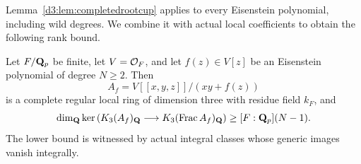 Lemma~\ref{d3:lem:completedrootcup} applies to every Eisenstein polynomial, including wild degrees. We combine it with actual local coefficients to obtain the following rank bound.


\begin{theorem}
\label{d3:thm:completedeisensteinrank}\label{d3:thm:completedtamerank}
Let $F/\mathbf Q_p$ be finite, let $V=\mathcal O_F$, and let $f(z)\in V[z]$ be an Eisenstein polynomial of degree $N\geq2$. Then
\[
A_f=V[[x,y,z]]/(xy+f(z))
\]
is a complete regular local ring of dimension three with residue field $k_F$, and
\[
\dim_{\mathbf Q}\ker\left(K_3(A_f)_{\mathbf Q}
\longrightarrow K_3(\operatorname{Frac} A_f)_{\mathbf Q}\right)
\geq [F:\mathbf Q_p](N-1).
\]
The lower bound is witnessed by actual integral classes whose generic images vanish integrally.
\end{theorem}

